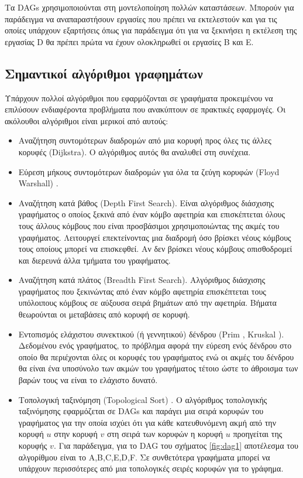 Τα DAGs χρησιμοποιούνται στη μοντελοποίηση πολλών καταστάσεων. Μπορούν για παράδειγμα να αναπαραστήσουν εργασίες που πρέπει να εκτελεστούν και για τις οποίες υπάρχουν εξαρτήσεις όπως για παράδειγμα ότι για να ξεκινήσει η εκτέλεση της εργασίας D θα πρέπει πρώτα να έχουν ολοκληρωθεί οι εργασίες B και E. 

\subsection{Σημαντικοί αλγόριθμοι γραφημάτων}
Υπάρχουν πολλοί αλγόριθμοι που εφαρμόζονται σε γραφήματα προκειμένου να επιλύσουν ενδιαφέροντα προβλήματα που ανακύπτουν σε πρακτικές εφαρμογές. Οι ακόλουθοι αλγόριθμοι είναι μερικοί από αυτούς:
\begin{itemize}[noitemsep]
	\item Αναζήτηση συντομότερων διαδρομών από μια κορυφή προς όλες τις άλλες κορυφές (Dijkstra). Ο αλγόριθμος αυτός θα αναλυθεί στη συνέχεια.
	\item Εύρεση μήκους συντομότερων διαδρομών για όλα τα ζεύγη κορυφών (Floyd Warshall) \cite{pa_floyd_warshall}.
	\item Αναζήτηση κατά βάθος (Depth First Search). Είναι αλγόριθμος διάσχισης γραφήματος ο οποίος ξεκινά από έναν κόμβο αφετηρία και επισκέπτεται όλους τους άλλους κόμβους που είναι προσβάσιμοι χρησιμοποιώντας της ακμές του γραφήματος. Λειτουργεί επεκτείνοντας μια διαδρομή όσο βρίσκει νέους κόμβους τους οποίους μπορεί να επισκεφθεί. Αν δεν βρίσκει νέους κόμβους οπισθοδρομεί και διερευνά άλλα τμήματα του γραφήματος.
	\item Αναζήτηση κατά πλάτος (Breadth First Search). Αλγόριθμος διάσχισης γραφήματος που ξεκινώντας από έναν κόμβο αφετηρία επισκέπτεται τους υπόλοιπους κόμβους σε αύξουσα σειρά βημάτων από την αφετηρία. Βήματα θεωρούνται οι μεταβάσεις από κορυφή σε κορυφή.
	\item Εντοπισμός ελάχιστου συνεκτικού (ή γεννητικού) δένδρου (Prim \cite{programiz_prim}, Kruskal \cite{programiz_kruskal}). Δεδομένου ενός γραφήματος, το πρόβλημα αφορά την εύρεση ενός δένδρου στο οποίο θα περιέχονται όλες οι κορυφές του γραφήματος ενώ οι ακμές του δένδρου θα είναι ένα υποσύνολο των ακμών του γραφήματος τέτοιο ώστε το άθροισμα των βαρών τους να είναι το ελάχιστο δυνατό.
	\item Τοπολογική ταξινόμηση (Topological Sort) \cite{g4g_topological_sort}. Ο αλγόριθμος τοπολογικής ταξινόμησης εφαρμόζεται σε DAGs και παράγει μια σειρά κορυφών του γραφήματος για την οποία ισχύει ότι για κάθε κατευθυνόμενη ακμή από την κορυφή $u$ στην κορυφή $v$ στη σειρά των κορυφών η κορυφή $u$ προηγείται της κορυφής $v$. Για παράδειγμα, για το DAG του σχήματος \ref{fig:dag1} αποτέλεσμα του αλγορίθμου είναι το A,B,C,E,D,F. Σε συνθετότερα γραφήματα μπορεί να υπάρχουν περισσότερες από μια τοπολογικές σειρές κορυφών για το γράφημα.

\end{itemize}
